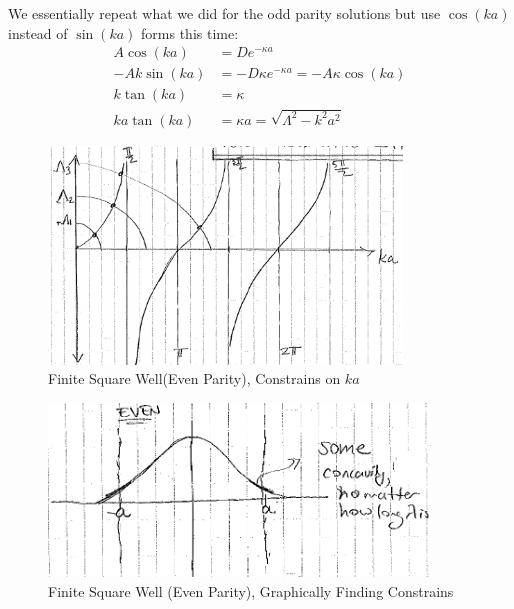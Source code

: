 \documentclass{school-22.101-notes}
\begin{document}
We essentially repeat what we did for the odd parity solutions but use $\cos(ka)$ instead of $\sin(ka)$ forms this time:
\begin{align}
A \cos (ka) &= D e^{-\kappa a} \\
-A k \sin (ka) &= - D \kappa e^{-\kappa a} = - A \kappa \cos (ka) \\
k \tan (ka) &= \kappa \\
ka \tan (ka) &= \kappa a = \sqrt{\Lambda^2 - k^2 a^2} 
\end{align}

\begin{figure}[h!]
    \centering
    \includegraphics[width=3.7in]{images/qm/FSW-even-graph-ka.png}
    \caption{Finite Square Well(Even Parity), Constrains on $ka$}
    \label{FSW-even-graph-ka}
\end{figure}
\begin{figure}[h!]
    \centering
    \includegraphics[width=4in]{images/qm/FSW-even-graph-psi.png}
    \caption{Finite Square Well (Even Parity), Graphically Finding Constrains}
    \label{FSW-even-graph-psi}
\end{figure}
\end{document}
